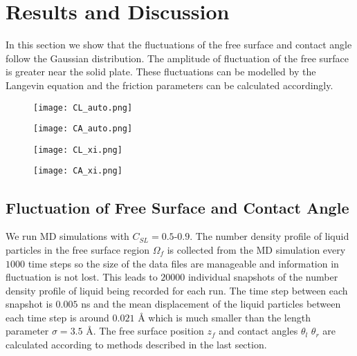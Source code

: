 \documentclass[
reprint,
 amsmath,amssymb,
 aps,
url
]{revtex4-1}
\begin{document}
\section{Results and Discussion}

In this section we show that the fluctuations of the free surface and contact angle follow the Gaussian distribution. The amplitude of fluctuation of the free surface is greater near the solid plate. These fluctuations can be modelled by the Langevin equation and the friction parameters can be calculated accordingly.

\begin{figure*}[t]
	\centering
	\begin{subfigure}[b]{0.45\linewidth}
		\caption{}
		\texttt{[image: CL\_auto.png]}
	\end{subfigure}	
	\begin{subfigure}[b]{0.45\linewidth}
		\caption{}
		\texttt{[image: CA\_auto.png]}
	\end{subfigure}
	\begin{subfigure}[b]{0.45\linewidth}
		\caption{}
		\texttt{[image: CL\_xi.png]}
	\end{subfigure}
	\begin{subfigure}[b]{0.45\linewidth}
		\caption{}
		\texttt{[image: CA\_xi.png]}
	\end{subfigure}
	\caption{\label{fig:auto}(a) and (b) show the time evolution of $\langle z_{cl}(t+t_0)z_{cl}(t_0)\rangle/\langle z_{cl}^2(t_0)\rangle$ and $\langle \theta(t+t_0)\theta(t_0)\rangle/\langle \theta^2(t_0)\rangle$ for $C_{SL}=0.5$-$0.9$. (c) and (d) show $\xi_{cl}$ and $\xi_{\theta}$ for different $C_{SL}$.}
\end{figure*}

\subsection{Fluctuation of Free Surface and Contact Angle}

We run MD simulations with $C_{SL}=0.5$-$0.9$. The number density profile of liquid particles in the free surface region $\Omega_f$ is collected from the MD simulation every $1000$ time steps so the size of the data files are manageable and information in fluctuation is not lost. This leads to $20000$ individual snapshots of the number density profile of liquid being recorded for each run. The time step between each snapshot is $0.005$ ns and the mean displacement of the liquid particles between each time step is around $0.021$ \si{\angstrom} which is much smaller than the length parameter $\sigma=3.5$ \si{\angstrom}. The free surface position $z_f$ and contact angles $\theta_l$ $\theta_r$ are calculated according to methods described in the last section.
\end{document}
